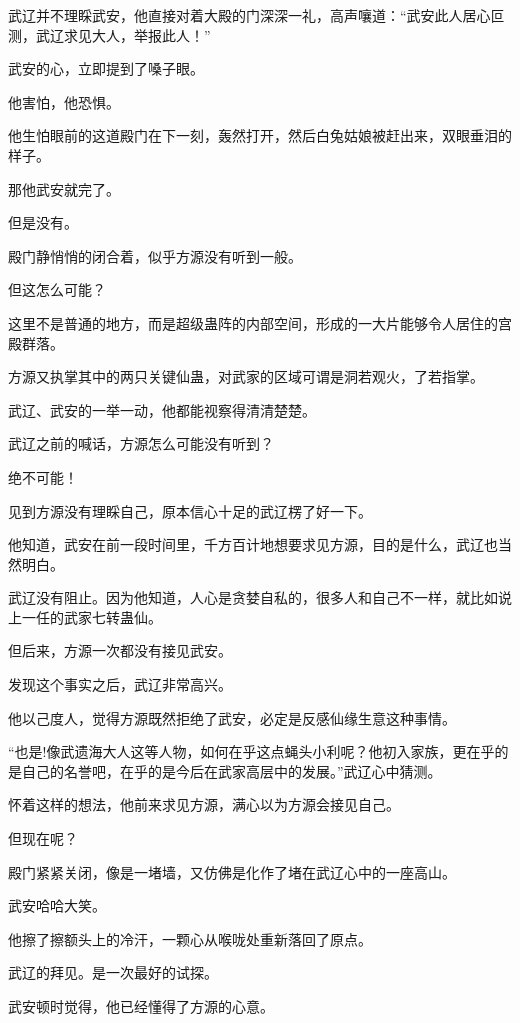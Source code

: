 
\begin{this_body}

武辽并不理睬武安，他直接对着大殿的门深深一礼，高声嚷道：“武安此人居心叵测，武辽求见大人，举报此人！”

武安的心，立即提到了嗓子眼。

他害怕，他恐惧。

他生怕眼前的这道殿门在下一刻，轰然打开，然后白兔姑娘被赶出来，双眼垂泪的样子。

那他武安就完了。

但是没有。

殿门静悄悄的闭合着，似乎方源没有听到一般。

但这怎么可能？

这里不是普通的地方，而是超级蛊阵的内部空间，形成的一大片能够令人居住的宫殿群落。

方源又执掌其中的两只关键仙蛊，对武家的区域可谓是洞若观火，了若指掌。

武辽、武安的一举一动，他都能视察得清清楚楚。

武辽之前的喊话，方源怎么可能没有听到？

绝不可能！

见到方源没有理睬自己，原本信心十足的武辽楞了好一下。

他知道，武安在前一段时间里，千方百计地想要求见方源，目的是什么，武辽也当然明白。

武辽没有阻止。因为他知道，人心是贪婪自私的，很多人和自己不一样，就比如说上一任的武家七转蛊仙。

但后来，方源一次都没有接见武安。

发现这个事实之后，武辽非常高兴。

他以己度人，觉得方源既然拒绝了武安，必定是反感仙缘生意这种事情。

“也是!像武遗海大人这等人物，如何在乎这点蝇头小利呢？他初入家族，更在乎的是自己的名誉吧，在乎的是今后在武家高层中的发展。”武辽心中猜测。

怀着这样的想法，他前来求见方源，满心以为方源会接见自己。

但现在呢？

殿门紧紧关闭，像是一堵墙，又仿佛是化作了堵在武辽心中的一座高山。

武安哈哈大笑。

他擦了擦额头上的冷汗，一颗心从喉咙处重新落回了原点。

武辽的拜见。是一次最好的试探。

武安顿时觉得，他已经懂得了方源的心意。


\end{this_body}
